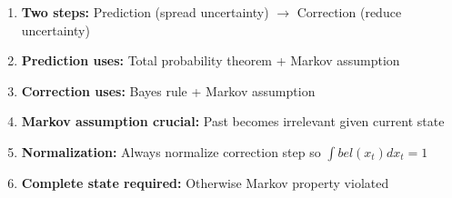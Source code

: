 \begin{tcolorbox}[colback=red!5!white,colframe=red!75!black,title=Remember for Exam]
\begin{enumerate}
    \item \textbf{Two steps:} Prediction (spread uncertainty) $\rightarrow$ Correction (reduce uncertainty)
    \item \textbf{Prediction uses:} Total probability theorem + Markov assumption
    \item \textbf{Correction uses:} Bayes rule + Markov assumption
    \item \textbf{Markov assumption crucial:} Past becomes irrelevant given current state
    \item \textbf{Normalization:} Always normalize correction step so $\int bel(x_t) dx_t = 1$
    \item \textbf{Complete state required:} Otherwise Markov property violated
\end{enumerate}
\end{tcolorbox}

